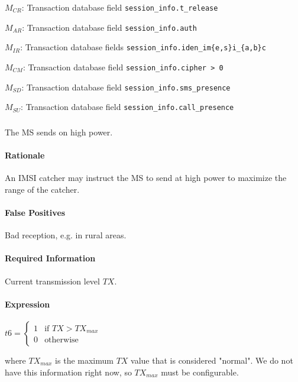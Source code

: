 \documentclass[a4paper,11pt,notitlepage,bigheadings,oneside]{scrartcl}
\begin{document}
$M_{CR}$: Transaction database field \verb|session_info.t_release|

$M_{AR}$: Transaction database field \verb|session_info.auth|

$M_{IR}$: Transaction database fields \verb|session_info.iden_im{e,s}i_{a,b}c|

$M_{CM}$: Transaction database field \verb|session_info.cipher > 0|

$M_{SD}$: Transaction database field \verb|session_info.sms_presence|

$M_{SU}$: Transaction database field \verb|session_info.call_presence|

\subsubsection{}

The MS sends on high power.

\paragraph{Rationale}

An IMSI catcher may instruct the MS to send at high power to maximize the range
of the catcher.

\paragraph{False Positives}

Bad reception, e.g. in rural areas.

\paragraph{Required Information}

Current transmission level $TX$.

\paragraph{Expression}

$t6 =
\begin{cases}
	1 & \text{if } TX > TX_{max} \\
	0 & \text{otherwise}
\end{cases}$

where $TX_{max}$ is the maximum $TX$ value that is considered "normal". We do
not have this information right now, so $TX_{max}$ must be configurable.
\end{document}
